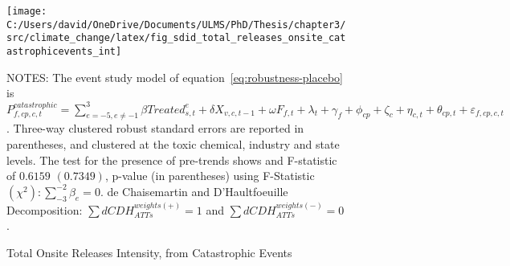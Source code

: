 \begin{figure}[H]
    \centering
    \texttt{[image: C:/Users/david/OneDrive/Documents/ULMS/PhD/Thesis/chapter3/src/climate\_change/latex/fig\_sdid\_total\_releases\_onsite\_catastrophicevents\_int]}
    \caption{Total Onsite Releases Intensity, from Catastrophic Events}
    \label{fig:baseline-placebo}
    \begin{minipage}{\columnwidth}
        \vspace{0.05in}
        \tiny NOTES: The event study model of equation~\ref{eq:robustness-placebo} is $P_{f,cp,c,t}^{catastrophic} = \sum_{{e = -5},{e \neq -1}}^{3}\beta Treated_{s,t}^e + \delta X_{v,c,t-1} + \omega F_{f,t} + \lambda_{t} + \gamma_{f} + \phi_{cp} + \zeta_{c} + \eta_{c,t} + \theta_{cp,t} + \varepsilon_{f,cp,c,t}$. Three-way clustered robust standard errors are reported in parentheses, and clustered at the toxic chemical, industry and state levels. The test for the presence of pre-trends shows and F-statistic of $0.6159$ $(0.7349)$, p-value (in parentheses) using F-Statistic $(\chi^2): \sum_{-3}^{-2} \beta_{e} = 0$. de Chaisemartin and D'Haultfoeuille Decomposition: $\sum dCDH_{ATTs}^{weights(+)} = 1$ and $\sum dCDH_{ATTs}^{weights(-)} = 0$.
    \end{minipage}
\end{figure}